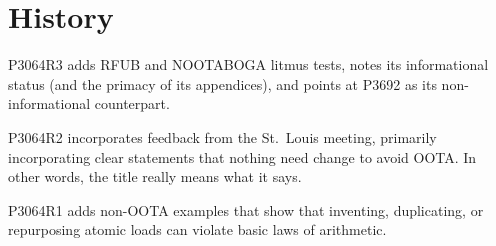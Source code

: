 \documentclass[10]{article}
\begin{document}

\section{History}
\label{sec:History}

P3064R3 adds RFUB and NOOTABOGA litmus tests, notes its informational
status (and the primacy of its appendices), and points at P3692 as
its non-informational counterpart.

P3064R2 incorporates feedback from the St.~Louis meeting, primarily
incorporating clear statements that nothing need change to avoid OOTA.
In other words, the title really means what it says.

P3064R1 adds non-OOTA examples that show that inventing, duplicating,
or repurposing atomic loads can violate basic laws of arithmetic.



\end{document}
